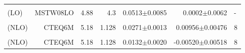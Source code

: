 \begin{table}
\begin{tabular*}{\textwidth}{@{\extracolsep{\fill}}lrrrrrl@{}}
    & & & & & & \\
    \cite{Sharma:2012dy} (LO) & MSTW08LO & 4.88 & 4.3 & 0.0513$\pm$0.0085 & 0.0002$\pm$0.0062 & -  \\
    & & & & & & \\
    \cite{Gong:2013qka} (NLO) & CTEQ6M & 5.18 & 1.128 & 0.0271$\pm$0.0013 & 0.00956$\pm$0.00476 & 8 \\
    & & & & & & \\
    \cite{Feng:2015wka} (NLO) & CTEQ6M & 5.18 & 1.128 & 0.0132$\pm$0.0020 & -0.00520$\pm$0.00518 & 8 \\
    \hline
    \hline
  \end{tabular*}
  \label{LDMEsY3S}
\end{table}
\normalsize








